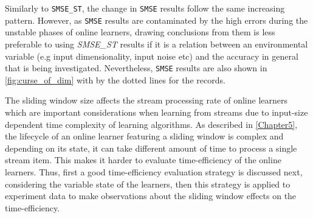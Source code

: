 Similarly to \texttt{SMSE\_ST}, the change in \texttt{SMSE} results follow the same increasing pattern. However, as \texttt{SMSE} results are contaminated by the high errors during the unstable phases of online learners, drawing conclusions from them is less preferable to using \textit{SMSE\_ST} results if it is a relation between an environmental variable (e.g input dimensionality, input noise etc) and the accuracy in general that is being investigated. Nevertheless, \texttt{SMSE} results are also shown in \ref{fig:curse_of_dim} with by the dotted lines for the records.

The sliding window size affects the stream processing rate of online learners which are important considerations when learning from streams due to input-size dependent time complexity of learning algorithms. As described in \ref{Chapter5}, the lifecycle of an online learner featuring a sliding window is complex and depending on its state, it can take different amount of time to process a single stream item. This makes it harder to evaluate time-efficiency of the online learners. Thus, first a good time-efficiency evaluation strategy is discussed next, considering the variable state of the learners, then this strategy is applied to experiment data to make observations about the sliding window effects on the time-efficiency.

